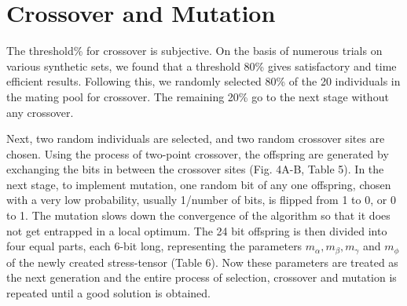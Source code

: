 \section{Crossover and Mutation}
The threshold\% for crossover is subjective. On the basis of numerous trials on various synthetic sets, we found that a threshold 80\% gives satisfactory and time efficient results. Following this, we randomly selected 80\% of the 20 individuals in the mating pool for crossover. The remaining 20\% go to the next stage without any crossover.

Next, two random individuals are selected, and two random crossover sites are chosen. Using the process of two-point crossover, the offspring are generated by exchanging the bits in between the crossover sites (Fig. 4A-B, Table 5). In the next stage, to implement mutation, one random bit of any one offspring, chosen with a very low probability, usually 1/number of bits, is flipped from 1 to 0, or 0 to 1. The mutation slows down the convergence of the algorithm so that it does not get entrapped in a local optimum. The 24 bit offspring is then divided into four equal parts, each 6-bit long, representing the parameters $m_{\alpha}, m_{\beta}, m_{\gamma}$ and $m_{\phi}$ of the newly created stress-tensor (Table 6). Now these parameters are treated as the next generation and the entire process of selection, crossover and mutation is repeated until a good solution is obtained.

